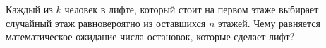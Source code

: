 Каждый из $k$ человек в лифте, который стоит на первом этаже выбирает случайный этаж равновероятно из оставшихся $n$
этажей. Чему равняется математическое ожидание числа остановок, которые сделает лифт?
